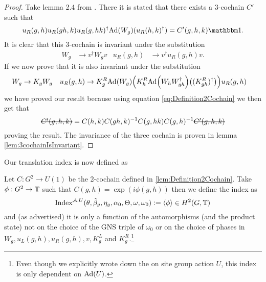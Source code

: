 \documentclass[11pt,a4paper,twoside]{article}
\numberwithin{equation}{section}
\begin{document}
\begin{proof}
	Take lemma 2.4 from \cite{ogata2021h3gmathbb}. There it is stated that there exists a 3-cochain $C'$ such that
	\begin{equation}\label{eq:defintion3CochainProof2Cochain}
		u_R(g,h)u_R(gh,k)u_R(g,hk)^\dagger\Ad{W_g}(u_R(h,k)^\dagger)=C'(g,h,k)\id.
	\end{equation}
	It is clear that this 3-cochain is invariant under the substitution
	\begin{align}
		W_g&\rightarrow v^\dagger W_g v&u_R(g,h)&\rightarrow v^\dagger u_R(g,h)v.
	\end{align}
	If we now prove that it is also invariant under the substitution
	\begin{align}\label{eq:SubstitutionForProofCochain}
		W_g&\rightarrow K_g W_g&u_R(g,h)&\rightarrow K_g^R\Ad{W_g}\left(K_h^R\Ad{W_hW_{gh}^\dagger}\left((K_{gh}^R)^\dagger\right)\right)u_
		R(g,h)
	\end{align}
	we have proved our result because using equation \eqref{eq:Definition2Cochain} we then get that
	\begin{equation}
		\stkout{C'(g,h,k)}=C(h,k)C(gh,k)^{-1}C(g,hk)C(g,h)^{-1}\stkout{C'(g,h,k)}
	\end{equation}
	proving the result. The invariance of the three cochain is proven in lemma \ref{lem:3cochainIsInvariant}.
\end{proof}
Our translation index is now defined as
\begin{definition}
	Let $C:G^2\rightarrow U(1)$ be the 2-cochain defined in \ref{lem:Definition2Cochain}. Take $\phi:G^2\rightarrow\mathbb T$ such that $C(g,h)=\exp(i\phi(g,h))$ then we define the index as
	\begin{equation}
	\textrm{Index}^{\mathcal A,U}(\theta,\tilde{\beta}_g,\eta_g,\alpha_0,\Theta,\omega,\omega_0)\vcentcolon=\expval{\phi}\in H^2(G,\mathbb T)
	\end{equation}
	and (as advertised) it is only a function of the automorphisms (and the product state) not on the choice of the GNS triple of $\omega_0$ or on the choice of phases in $W_g,u_L(g,h),u_R(g,h),v,K_g^L$ and $K_g^R$.\footnote{Even though we explicitly wrote down the on site group action $U$, this index is only dependent on $\Ad{U}$.}
\end{definition}
\end{document}
